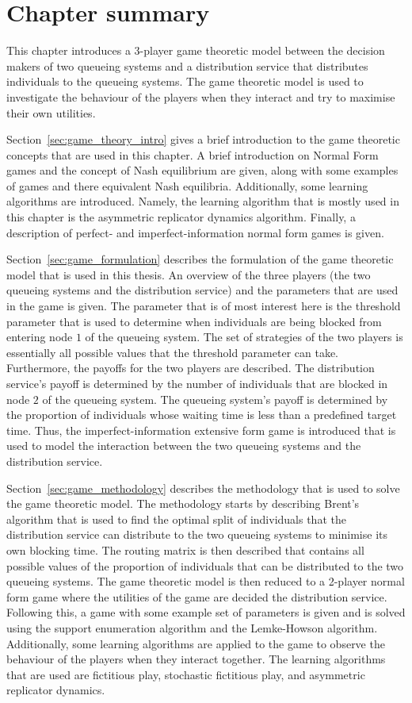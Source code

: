 \section{Chapter summary}

This chapter introduces a 3-player game theoretic model between the decision 
makers of two queueing systems and a distribution service that distributes
individuals to the queueing systems.
The game theoretic model is used to investigate the behaviour of the players
when they interact and try to maximise their own utilities.

Section~\ref{sec:game_theory_intro} gives a brief introduction to the game
theoretic concepts that are used in this chapter.
A brief introduction on Normal Form games and the concept of Nash equilibrium
are given, along with some examples of games and there equivalent Nash
equilibria.
Additionally, some learning algorithms are introduced.
Namely, the learning algorithm that is mostly used in this chapter is the
asymmetric replicator dynamics algorithm.
Finally, a description of perfect- and imperfect-information normal form games
is given.

Section~\ref{sec:game_formulation} describes the formulation of the game
theoretic model that is used in this thesis.
An overview of the three players (the two queueing systems and the
distribution service) and the parameters that are used in the game is given.
The parameter that is of most interest here is the threshold parameter that
is used to determine when individuals are being blocked from entering node
\(1\) of the queueing system.
The set of strategies of the two players is essentially all possible values
that the threshold parameter can take.
Furthermore, the payoffs for the two players are described.
The distribution service's payoff is determined by the number of individuals
that are blocked in node \(2\) of the queueing system.
The queueing system's payoff is determined by the proportion of individuals
whose waiting time is less than a predefined target time.
Thus, the imperfect-information extensive form game is introduced that is
used to model the interaction between the two queueing systems and the
distribution service.

Section~\ref{sec:game_methodology} describes the methodology that is used to
solve the game theoretic model.
The methodology starts by describing Brent's algorithm that is used to find
the optimal split of individuals that the distribution service can distribute
to the two queueing systems to minimise its own blocking time.
The routing matrix is then described that contains all possible values of the
proportion of individuals that can be distributed to the two queueing systems.
The game theoretic model is then reduced to a 2-player normal form game where
the utilities of the game are decided the distribution service.
Following this, a game with some example set of parameters is given and
is solved using the support enumeration algorithm and the Lemke-Howson
algorithm.
Additionally, some learning algorithms are applied to the game to observe
the behaviour of the players when they interact together.
The learning algorithms that are used are fictitious play, stochastic
fictitious play, and asymmetric replicator dynamics.

